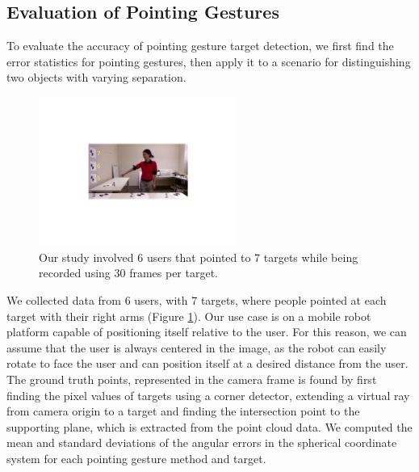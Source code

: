 \documentclass[3p]{elsarticle}
\begin{document}
\subsection{Evaluation of Pointing Gestures}
\label{sec:eval_pointing_gestures}

To evaluate the accuracy of pointing gesture target detection, we first find the error statistics for pointing gestures, then apply it to a scenario for distinguishing two objects with varying separation.

\begin{figure}[thpb]
\centering
\includegraphics[width=65mm]{pics/data_collection_crop}
\caption{Our study involved 6 users that pointed to 7 targets while being recorded using 30 frames per target.}
\label{fig:ground_truth_targets}
\end{figure}

We collected data from 6 users, with 7 targets, where people pointed at each target with their right arms (Figure \ref{fig:ground_truth_targets}). Our use case is on a mobile robot platform capable of positioning itself relative to the user.  For this reason, we can assume that the user is always centered in the image, as the robot can easily rotate to face the user and can position itself at a desired distance from the user. The ground truth points, represented in the camera frame is found by first finding the pixel values of targets using a corner detector, extending a virtual ray from camera origin to a target and finding the intersection point to the supporting plane, which is extracted from the point cloud data. We computed the mean and standard deviations of the angular errors in the spherical coordinate system for each pointing gesture method and target. 
\end{document}

